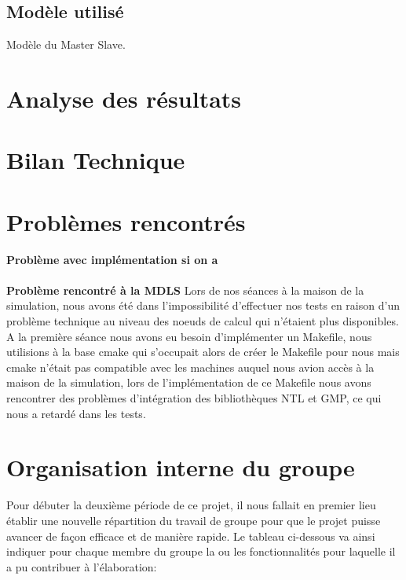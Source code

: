 		\subsection{Modèle utilisé}
		Modèle du Master Slave.

	\section{Analyse des résultats}
		 	
	
	\section{Bilan Technique}	
		
	\section{Problèmes rencontrés}
	
	\textbf{Problème avec implémentation si on a}
	\paragraph{} \textbf{Problème rencontré à la MDLS}
	Lors de nos séances à la maison de la simulation, nous avons été dans l'impossibilité d'effectuer nos tests en raison d'un problème technique au niveau des noeuds de calcul qui n'étaient plus disponibles.
	A la première séance nous avons eu besoin d'implémenter un Makefile, nous utilisions à la base cmake qui s'occupait alors de créer le Makefile pour nous mais cmake n'était pas compatible avec les machines auquel nous avion accès à la maison de la simulation, lors de l'implémentation de ce Makefile nous avons rencontrer des problèmes d'intégration des bibliothèques NTL et GMP, ce qui nous a retardé dans les tests.
					
	\section{Organisation interne du groupe}
	Pour débuter la deuxième période de ce projet, il nous fallait en premier lieu établir une nouvelle répartition du travail de groupe pour que le projet puisse avancer de façon efficace et de manière rapide. Le tableau ci-dessous va ainsi indiquer pour chaque membre du groupe la ou les fonctionnalités pour laquelle il a pu contribuer à l'élaboration: \\
	
